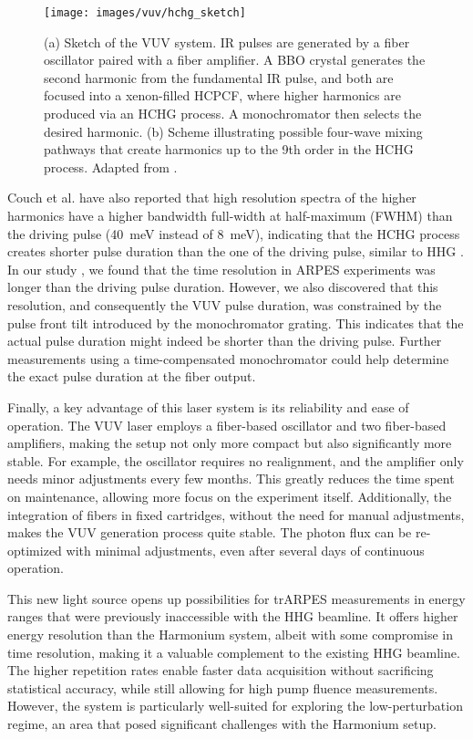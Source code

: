 \begin{figure}
	\centering
	\texttt{[image: images/vuv/hchg\_sketch]}
	\caption{(a) Sketch of the VUV system. IR pulses are generated by a  fiber oscillator paired with a fiber amplifier. A BBO crystal generates the second harmonic from the fundamental IR pulse, and both are focused into a xenon-filled HCPCF, where higher harmonics are produced via an HCHG process. A monochromator then selects the desired harmonic. (b) Scheme illustrating possible four-wave mixing pathways that create harmonics up to the 9th order in the HCHG process. Adapted from \cite{couch_ultrafast_2020}.}
	\label{fig:hchgsketch}
\end{figure}

Couch et al. \cite{couch_ultrafast_2020} have also reported that high resolution spectra of the higher harmonics have a higher bandwidth full-width at half-maximum (FWHM) than the driving pulse (\qty{40}{\milli\electronvolt} instead of \qty{8}{\milli\electronvolt}), indicating that the HCHG process creates shorter pulse duration than the one of the driving pulse, similar to HHG \cite{gagnon_soft_2007}.
In our study \cite{hellbruck_high-resolution_2024}, we found that the time resolution in ARPES experiments was longer than the driving pulse duration.
However, we also discovered that this resolution, and consequently the VUV pulse duration, was constrained by the pulse front tilt introduced by the monochromator grating.
This indicates that the actual pulse duration might indeed be shorter than the driving pulse.
Further measurements using a time-compensated monochromator could help determine the exact pulse duration at the fiber output.

Finally, a key advantage of this laser system is its reliability and ease of operation.
The VUV laser employs a fiber-based oscillator and two fiber-based amplifiers, making the setup not only more compact but also significantly more stable.
For example, the oscillator requires no realignment, and the amplifier only needs minor adjustments every few months.
This greatly reduces the time spent on maintenance, allowing more focus on the experiment itself.
Additionally, the integration of fibers in fixed cartridges, without the need for manual adjustments, makes the VUV generation process quite stable.
The photon flux can be re-optimized with minimal adjustments, even after several days of continuous operation.

This new light source opens up possibilities for trARPES measurements in energy ranges that were previously inaccessible with the HHG beamline.
It offers higher energy resolution than the Harmonium system, albeit with some compromise in time resolution, making it a valuable complement to the existing HHG beamline.
The higher repetition rates enable faster data acquisition without sacrificing statistical accuracy, while still allowing for high pump fluence measurements.
However, the system is particularly well-suited for exploring the low-perturbation regime, an area that posed significant challenges with the Harmonium setup.

